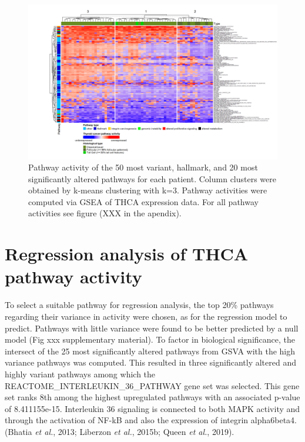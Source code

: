 \documentclass[
  parskip,
  oneside]{scrreprt}
\begin{document}
\begin{figure}

{\centering \includegraphics[width=1\linewidth]{figures/THCA GSEA Heatmap fertig top 50} 

}

\caption{Pathway activity of the 50 most variant, hallmark, and 20 most significantly altered pathways for each patient. Column clusters were obtained by k-means clustering with k=3. Pathway activities were computed via GSEA of THCA expression data. For all pathway activities see figure (XXX in the apendix).}\label{fig:THCAhmGSEA}
\end{figure}

\hypertarget{regression-analysis-of-thca-pathway-activity}{%
\section{Regression analysis of THCA pathway
activity}\label{regression-analysis-of-thca-pathway-activity}}

To select a suitable pathway for regression analysis, the top 20\%
pathways regarding their variance in activity were chosen, as for the
regression model to predict. Pathways with little variance were found to
be better predicted by a null model (Fig xxx supplementary material). To
factor in biological significance, the intersect of the 25 most
significantly altered pathways from GSVA with the high variance pathways
was computed. This resulted in three significantly altered and highly
variant pathways among which the REACTOME\_INTERLEUKIN\_36\_PATHWAY gene
set was selected. This gene set ranks 8th among the highest upregulated
pathways with an associated p-value of 8.411155e-15. Interleukin 36
signaling is connected to both MAPK activity and through the activation
of NF-kB and also the expression of integrin alpha6beta4.(Bhatia
\emph{et al.}, 2013; Liberzon \emph{et al.}, 2015b; Queen \emph{et al.},
2019).
\end{document}
